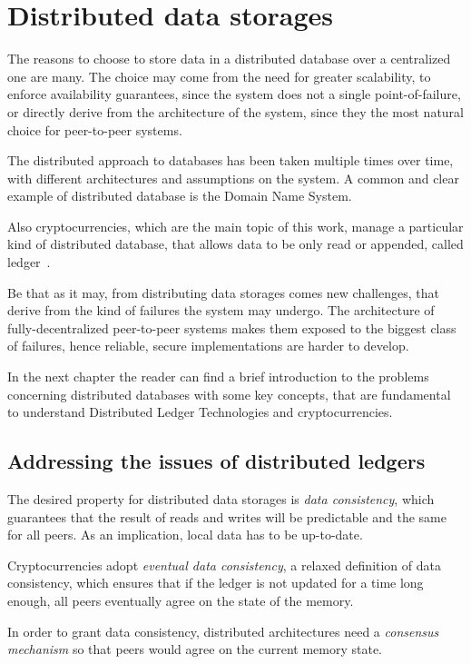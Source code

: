 \chapter{Distributed data storages}
\label{intro}
The reasons to choose to store data in a distributed database over a centralized one are many. The choice may come from the need for greater scalability, to enforce availability guarantees, since the system does not a single point-of-failure, or directly derive from the architecture of the system, since they the most natural choice for peer-to-peer systems.

The distributed approach to databases has been taken multiple times over time, with different architectures and assumptions on the system. A common and clear example of distributed database is the Domain Name System.

Also cryptocurrencies, which are the main topic of this work, manage a particular kind of distributed database, that allows data to be only read or appended, called ledger~\cite{Sunyaev2020}. 

Be that as it may, from distributing data storages comes new challenges, that derive from the kind of failures the system may undergo. The architecture of fully-decentralized peer-to-peer systems makes them exposed to the biggest class of failures, hence reliable, secure implementations are harder to develop.

In the next chapter the reader can find a brief introduction to the problems concerning distributed databases with some key concepts, that are fundamental to understand Distributed Ledger Technologies and cryptocurrencies. 

\section{Addressing the issues of distributed ledgers}\label{ledgerproblems}
The desired property  for distributed data storages is \emph{data consistency}, which guarantees that the result of reads and writes will be predictable and the same for all peers. As an implication, local data has to be up-to-date. 

Cryptocurrencies adopt \emph{eventual data consistency}, a relaxed definition of data consistency, which ensures that if the ledger is not updated for a time long enough, all peers eventually agree on the state of the memory.

In order to grant data consistency, distributed architectures need a \emph{consensus mechanism} so that peers would agree on the current memory state.

